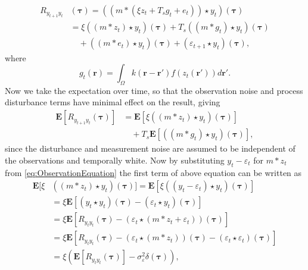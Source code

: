 \documentclass[10pt,twocolumn,twoside]{IEEEtran}
\begin{document}
\begin{align}
	R_{y_{t+1}y_t}&(\boldsymbol{\tau}) = (\left(m \ast \left(\xi z_t +  T_s g_t + e_t\right)\right) \star y_t)(\boldsymbol{\tau}) \nonumber\\
	&= \xi\left(\left(m \ast z_t\right) \star y_t \right)(\boldsymbol{\tau})+ T_s \left(\left(m\ast g_t\right)\star y_t \right)(\boldsymbol{\tau}) \nonumber\\
	&\quad+ \left(\left(m\ast e_t\right)\star y_t \right)(\boldsymbol{\tau})+ (\varepsilon_{t+1} \star y_t)(\boldsymbol{\tau}),
\end{align}
where
\begin{equation}\label{eq:averagefiringrate}
	g_t(\mathbf r)=\int_{\Omega}k\left(\mathbf{r}-\mathbf{r}'\right)f(z_{t}\left(\mathbf{r}'\right))d\mathbf{r}'.
\end{equation}
Now we take the expectation over time, so that the observation noise and process disturbance terms have minimal effect on the result, giving 
\begin{align}\label{eq:ExpectationToCancelNoise}
	\mathbf{E}[R_{y_{t+1}y_t}(\boldsymbol{\tau})] &= \mathbf{E}[\xi\left(\left(m \ast z_t\right) \star y_t \right)(\boldsymbol{\tau})] \nonumber \\
	 &\quad+ T_s \mathbf{E}[\left(\left(m\ast g_t\right)\star y_t \right)(\boldsymbol{\tau})],
\end{align}
since the disturbance and measurement noise are assumed to be independent of the observations and temporally white. Now by substituting $y_t - \varepsilon_t$ for $m\ast z_t$ from \eqref{eq:ObservationEquation} the first term of above equation can be written as
\begin{align}
	\mathbf{E}[\xi&\left(\left(m \ast z_t \right) \star y_t \right)(\boldsymbol{\tau})] = \mathbf{E}\left[\xi\left(\left(y_t-\varepsilon_t\right) \star y_t \right)(\boldsymbol{\tau})\right] \nonumber \\
	&= \xi \mathbf{E}\left[ (y_t \star y_t)(\boldsymbol{\tau}) - \left(\varepsilon_t\star y_t \right)(\boldsymbol{\tau})\right] \nonumber \\
	&= \xi\mathbf{E}[ R_{y_ty_t}(\boldsymbol{\tau})  - \left(\varepsilon_t \star (m\ast z_t + \varepsilon_t)\right) (\boldsymbol{\tau})] \nonumber \\
	&=\xi\mathbf{E}[ R_{y_ty_t}(\boldsymbol{\tau}) -\left(\varepsilon_t\star (m\ast z_t)\right)(\boldsymbol{\tau}) - (\varepsilon_t\star\varepsilon_t)(\boldsymbol{\tau})] \nonumber\\ 
	&= \xi\left(\mathbf{E}[ R_{y_ty_t}(\boldsymbol{\tau})] - \sigma_{\varepsilon}^2 \delta(\boldsymbol{\tau})\right), \label{eq:FirstTermReduced}
\end{align}
\end{document}
